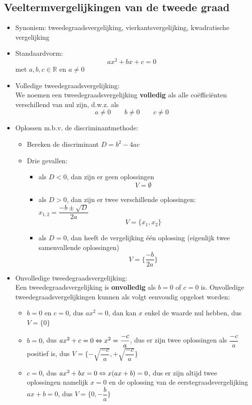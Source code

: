 \documentclass[12pt]{article}
\begin{document}
\begin{theorie}

\pagebreak
\subsection{Veeltermvergelijkingen van de tweede graad}

\begin{itemize}
\item Synoniem: tweedegraadsvergelijking, vierkantsvergelijking, kwadratische vergelijking
\item Standaardvorm:
  $$ax^2 + bx + c = 0$$
  met $a, b, c \in \mathbb{R}$ en $a\neq 0$
\item Volledige tweedegraadsvergelijking:\\
  We noemen een tweedegraadsvergelijking {\bf volledig} als alle coëfficiënten verschillend van nul zijn, d.w.z. als
  $$ a\neq 0 \qquad b\neq 0 \qquad c\neq 0$$
\item Oplossen m.b.v. de discriminantmethode:
  \begin{itemize}
  \item Bereken de discriminant $D=b^2-4ac$
  \item Drie gevallen:
    \begin{itemize}
    \item als $D<0$, dan zijn er geen oplossingen
      $$V=\emptyset$$
    \item als $D>0$, dan zijn er twee verschillende oplossingen: $x_{1,2}=\dfrac{-b\pm\sqrt{D}}{2a}$
      $$V=\{x_1, x_2\}$$
    \item als $D=0$, dan heeft de vergelijking één oplossing (eigenlijk twee samenvallende oplossingen)
      $$V=\{\dfrac{-b}{2a}\}$$
    \end{itemize}
  \end{itemize}
\item Onvolledige tweedegraadsvergelijking:\\
  Een tweedegraadsvergelijking is {\bf onvolledig} als $b=0$ of $c=0$ is. Onvolledige tweedegraadsvergelijkingen kunnen als volgt eenvoudig opgelost worden:
  \begin{itemize}
    \item $b=0$ en $c=0$, dus $ax^2=0$, dan kan $x$ enkel de waarde nul hebben, dus $V=\{0\}$
    \item $b=0$, dus $ax^2+c=0\Leftrightarrow x^2=\dfrac{-c}{a}$, dus er zijn twee oplossingen als $\dfrac{-c}{a}$ positief is, dus $V=\{-\sqrt{\dfrac{-c}{a}}, +\sqrt{\dfrac{-c}{a}}\}$
    \item $c=0$, dus $ax^2+bx=0\Leftrightarrow x(ax+b)=0$, dus er zijn altijd twee oplossingen namelijk $x=0$ en de oplossing van de eerstegraadsvergelijking $ax+b=0$, dus $V=\{0, -\dfrac{b}{a}\}$
  \end{itemize}
\end{itemize}

\end{theorie}
\end{document}
